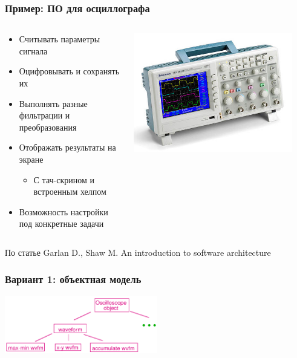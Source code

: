 \documentclass[xetex,mathserif,serif]{beamer}
\begin{document}
	\begin{frame}
		\frametitle{Пример: ПО для осциллографа}
		\begin{columns}
			\begin{column}{0.6\textwidth}
				\begin{itemize}
					\item Считывать параметры сигнала
					\item Оцифровывать и сохранять их
					\item Выполнять разные фильтрации и преобразования
					\item Отображать результаты на экране
					\begin{itemize}
						\item С тач-скрином и встроенным хелпом
					\end{itemize}
					\item Возможность настройки под конкретные задачи
				\end{itemize}
			\end{column}
			\begin{column}{0.4\textwidth}
				\begin{center}
					\includegraphics[width=0.9\textwidth]{oscilloscope.png}
				\end{center}
			\end{column}
		\end{columns}
		\vspace{1cm}
		\begin{tiny}
			По статье Garlan D., Shaw M. An introduction to software architecture
		\end{tiny}
	\end{frame}

	\begin{frame}
		\frametitle{Вариант 1: объектная модель}
		\begin{center}
			\includegraphics[width=0.5\textwidth]{oscilloscopeObjects.png}
		\end{center}
	\end{frame}
\end{document}
